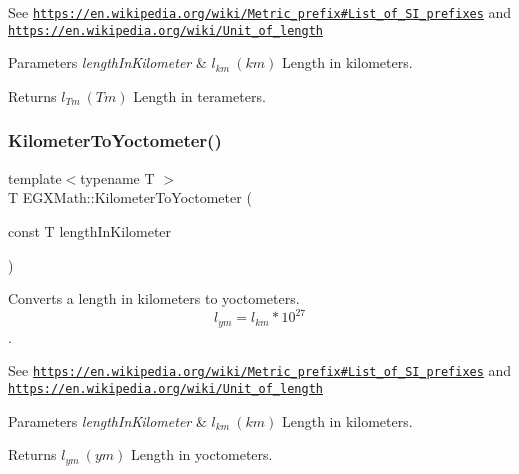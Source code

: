 See \href{https://en.wikipedia.org/wiki/Metric_prefix#List_of_SI_prefixes}{\tt https\+://en.\+wikipedia.\+org/wiki/\+Metric\+\_\+prefix\#\+List\+\_\+of\+\_\+\+S\+I\+\_\+prefixes} and \href{https://en.wikipedia.org/wiki/Unit_of_length}{\tt https\+://en.\+wikipedia.\+org/wiki/\+Unit\+\_\+of\+\_\+length} 
\begin{DoxyParams}{Parameters}
{\em length\+In\+Kilometer} & $ l_{km}\ (km)$ Length in kilometers. \\
\hline
\end{DoxyParams}
\begin{DoxyReturn}{Returns}
$ l_{Tm}\ (Tm)$ Length in terameters. 
\end{DoxyReturn}
\mbox{\label{group___e_g_x_math-_conversions-_length_conversions-_s_i-_kilometer-_s_i_gaf03c100edda155de40290d8c3e155a27}} 
\subsubsection{\texorpdfstring{Kilometer\+To\+Yoctometer()}{KilometerToYoctometer()}}
{\footnotesize\ttfamily template$<$typename T $>$ \\
T E\+G\+X\+Math\+::\+Kilometer\+To\+Yoctometer (\begin{DoxyParamCaption}\item[{const T}]{length\+In\+Kilometer }\end{DoxyParamCaption})}



Converts a length in kilometers to yoctometers. \[ l_{ym}=l_{km} * 10^{27} \]. 

See \href{https://en.wikipedia.org/wiki/Metric_prefix#List_of_SI_prefixes}{\tt https\+://en.\+wikipedia.\+org/wiki/\+Metric\+\_\+prefix\#\+List\+\_\+of\+\_\+\+S\+I\+\_\+prefixes} and \href{https://en.wikipedia.org/wiki/Unit_of_length}{\tt https\+://en.\+wikipedia.\+org/wiki/\+Unit\+\_\+of\+\_\+length} 
\begin{DoxyParams}{Parameters}
{\em length\+In\+Kilometer} & $ l_{km}\ (km)$ Length in kilometers. \\
\hline
\end{DoxyParams}
\begin{DoxyReturn}{Returns}
$ l_{ym}\ (ym)$ Length in yoctometers. 
\end{DoxyReturn}
\mbox{\label{group___e_g_x_math-_conversions-_length_conversions-_s_i-_kilometer-_s_i_gaf29070fac412b7a92466866b2ae32337}} 
